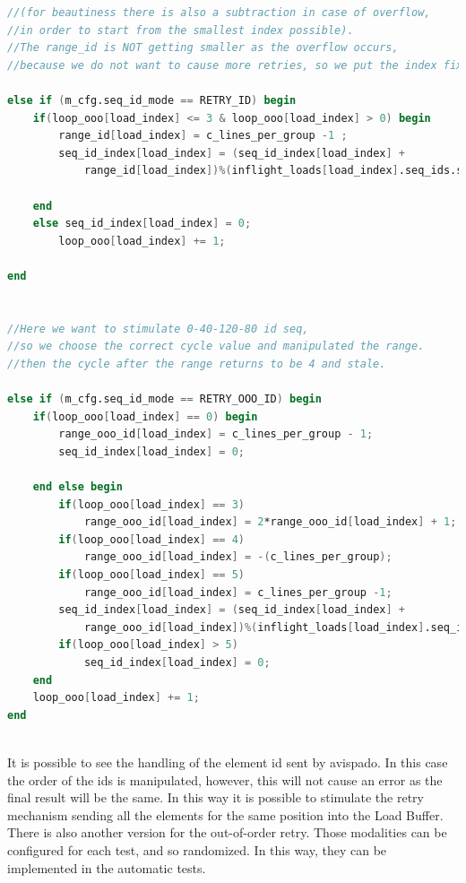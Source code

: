 \linespread{1}
\begin{lstlisting}[language=Verilog,style=verilog-style, backgroundcolor=\color{lyel_palette}, frame=tlb]
//(for beautiness there is also a subtraction in case of overflow, 
//in order to start from the smallest index possible).
//The range_id is NOT getting smaller as the overflow occurs, 
//because we do not want to cause more retries, so we put the index fixed to 0

else if (m_cfg.seq_id_mode == RETRY_ID) begin
    if(loop_ooo[load_index] <= 3 & loop_ooo[load_index] > 0) begin
        range_id[load_index] = c_lines_per_group -1 ;
        seq_id_index[load_index] = (seq_id_index[load_index] +
            range_id[load_index])%(inflight_loads[load_index].seq_ids.size());
            
    end
    else seq_id_index[load_index] = 0;
        loop_ooo[load_index] += 1;
        
end


//Here we want to stimulate 0-40-120-80 id seq, 
//so we choose the correct cycle value and manipulated the range.
//then the cycle after the range returns to be 4 and stale.

else if (m_cfg.seq_id_mode == RETRY_OOO_ID) begin
    if(loop_ooo[load_index] == 0) begin
        range_ooo_id[load_index] = c_lines_per_group - 1;
        seq_id_index[load_index] = 0;

    end else begin
        if(loop_ooo[load_index] == 3) 
            range_ooo_id[load_index] = 2*range_ooo_id[load_index] + 1;
        if(loop_ooo[load_index] == 4) 
            range_ooo_id[load_index] = -(c_lines_per_group);
        if(loop_ooo[load_index] == 5) 
            range_ooo_id[load_index] = c_lines_per_group -1;
        seq_id_index[load_index] = (seq_id_index[load_index] +
            range_ooo_id[load_index])%(inflight_loads[load_index].seq_ids.size());
        if(loop_ooo[load_index] > 5) 
            seq_id_index[load_index] = 0;
    end
    loop_ooo[load_index] += 1;
end



\end{lstlisting}
\linespread{1.2}

It is possible to see the handling of the element id sent by avispado. In this case the order of the ids is manipulated, however, this will not cause an error as the final result will be the same.
In this way it is possible to stimulate the retry mechanism sending all the elements for the same position into the Load Buffer. There is also another version for the out-of-order retry.
Those modalities can be configured for each test, and so randomized. In this way, they can be implemented in the automatic tests.


